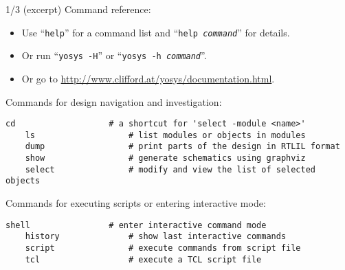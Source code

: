 \begin{frame}[fragile]{\subsecname{} 1/3 \hspace{0pt plus 1 filll} (excerpt)}
Command reference:
\begin{itemize}
\item Use ``{\tt help}'' for a command list and ``{\tt help \it command}'' for details.
\item Or run ``{\tt yosys -H}'' or ``{\tt yosys -h \it command}''.
\item Or go to \url{http://www.clifford.at/yosys/documentation.html}.
\end{itemize}

\bigskip
Commands for design navigation and investigation:
\begin{lstlisting}[xleftmargin=1cm, basicstyle=\ttfamily\fontsize{8pt}{10pt}\selectfont, language=ys]
    cd                   # a shortcut for 'select -module <name>'
    ls                   # list modules or objects in modules
    dump                 # print parts of the design in RTLIL format
    show                 # generate schematics using graphviz
    select               # modify and view the list of selected objects
\end{lstlisting}

\bigskip
Commands for executing scripts or entering interactive mode:
\begin{lstlisting}[xleftmargin=1cm, basicstyle=\ttfamily\fontsize{8pt}{10pt}\selectfont, language=ys]
    shell                # enter interactive command mode
    history              # show last interactive commands
    script               # execute commands from script file
    tcl                  # execute a TCL script file
\end{lstlisting}
\end{frame}

